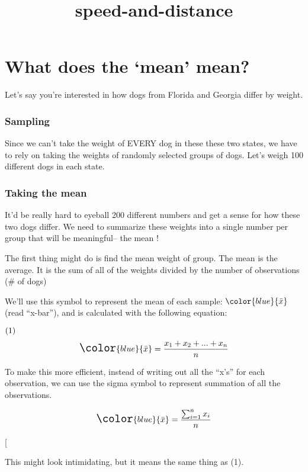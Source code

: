\documentclass[]{article}
\title{speed-and-distance}
\author{}
\date{}
\begin{document}
\maketitle

\section{\texorpdfstring{What does the `mean'
mean?}{What does the mean mean?}}\label{what-does-the-mean-mean}

Let's say you're interested in how dogs from Florida and Georgia differ
by weight.

\subsubsection{Sampling}\label{sampling}

Since we can't take the weight of EVERY dog in these these two states,
we have to rely on taking the weights of randomly selected groups of
dogs. Let's weigh 100 different dogs in each state.

\subsubsection{Taking the mean}\label{taking-the-mean}

It'd be really hard to eyeball 200 different numbers and get a sense for
how these two dogs differ. We need to summarize these weights into a
single number per group that will be meaningful-- { the mean }!

The first thing might do is find the mean weight of group. The mean is
the average. It is the sum of all of the weights divided by the number
of observations (\# of dogs)

We'll use this symbol to represent the mean of each sample:
\(\color{blue}{\bar{x}}\) (read ``x-bar''), and is calculated with the
following equation:

\(\text(1)\)
\[\Large \color{blue}{\bar{x}} = \frac{x_1 + x_2 + ... + x_n}{n}\]

To make this more efficient, instead of writing out all the ``x's'' for
each observation, we can use the sigma symbol to represent summation of
all the observations.

\begin{equation}
\label{eq-abc}

 \Large \color{blue}{\bar{x}} = \frac{\sum_{i=1}^n x_i}{n}
 
 \end{equation}

{[}\code{]}

This might look intimidating, but it means the same thing as (1).
\end{document}
